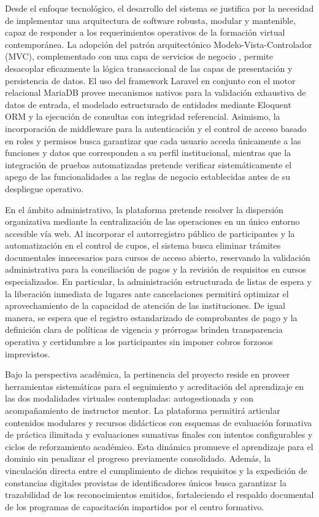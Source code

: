 Desde el enfoque tecnológico, el desarrollo del sistema se justifica por la necesidad de implementar una arquitectura de software robusta, modular y mantenible, capaz de responder a los requerimientos operativos de la formación virtual contemporánea. La adopción del patrón arquitectónico Modelo-Vista-Controlador (MVC), complementado con una capa de servicios de negocio \cite{fowler2002patterns}, permite desacoplar eficazmente la lógica transaccional de las capas de presentación y persistencia de datos. El uso del framework Laravel en conjunto con el motor relacional MariaDB provee mecanismos nativos para la validación exhaustiva de datos de entrada, el modelado estructurado de entidades mediante Eloquent ORM y la ejecución de consultas con integridad referencial. Asimismo, la incorporación de middleware para la autenticación y el control de acceso basado en roles y permisos busca garantizar que cada usuario acceda únicamente a las funciones y datos que corresponden a su perfil institucional, mientras que la integración de pruebas automatizadas pretende verificar sistemáticamente el apego de las funcionalidades a las reglas de negocio establecidas antes de su despliegue operativo.

En el ámbito administrativo, la plataforma pretende resolver la dispersión organizativa mediante la centralización de las operaciones en un único entorno accesible vía web. Al incorporar el autorregistro público de participantes y la automatización en el control de cupos, el sistema busca eliminar trámites documentales innecesarios para cursos de acceso abierto, reservando la validación administrativa para la conciliación de pagos y la revisión de requisitos en cursos especializados. En particular, la administración estructurada de listas de espera y la liberación inmediata de lugares ante cancelaciones permitirá optimizar el aprovechamiento de la capacidad de atención de las instituciones. De igual manera, se espera que el registro estandarizado de comprobantes de pago y la definición clara de políticas de vigencia y prórrogas brinden transparencia operativa y certidumbre a los participantes sin imponer cobros forzosos imprevistos.

Bajo la perspectiva académica, la pertinencia del proyecto reside en proveer herramientas sistemáticas para el seguimiento y acreditación del aprendizaje en las dos modalidades virtuales contempladas: autogestionada y con acompañamiento de instructor mentor. La plataforma permitirá articular contenidos modulares y recursos didácticos con esquemas de evaluación formativa de práctica ilimitada y evaluaciones sumativas finales con intentos configurables y ciclos de reforzamiento académico. Esta dinámica promueve el aprendizaje para el dominio sin penalizar el progreso previamente consolidado. Además, la vinculación directa entre el cumplimiento de dichos requisitos y la expedición de constancias digitales provistas de identificadores únicos busca garantizar la trazabilidad de los reconocimientos emitidos, fortaleciendo el respaldo documental de los programas de capacitación impartidos por el centro formativo.


